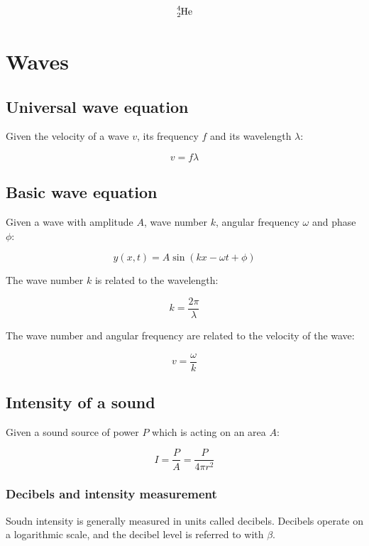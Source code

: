 \documentclass[12pt]{article}
\begin{document}
\[
\ce{^4_2He}
\]

\newpage

\section{Waves}

\subsection{Universal wave equation}

Given the velocity of a wave $v$, its frequency $f$ and its wavelength $\lambda$:

\[
\boxed{
v = f\lambda
}
\]

\subsection{Basic wave equation}

Given a wave with amplitude $A$, wave number $k$, angular frequency $\omega$ and phase $\phi$:

\[
\boxed{
y(x,t) = A\sin(kx - \omega t + \phi)
}
\]

The wave number $k$ is related to the wavelength:

\[
\boxed{
k = \frac{2\pi}{\lambda}
}
\]

The wave number and angular frequency are related to the velocity of the wave:

\[
\boxed{
v = \frac{\omega}{k}
}
\]


\subsection{Intensity of a sound}

Given a sound source of power $P$ which is acting on an area $A$:

\[
\boxed{
I = \frac{P}{A} = \frac{P}{4\pi r^2}
}
\]

\subsubsection{Decibels and intensity measurement}

Soudn intensity is generally measured in units called decibels.
Decibels operate on a logarithmic scale, and the decibel level is referred to with $\beta$.
\end{document}
